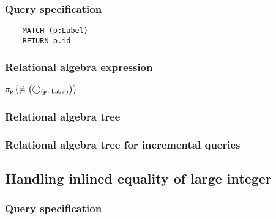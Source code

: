 	\subsubsection*{Query specification}

	\begin{lstlisting}
	MATCH (p:Label)
	RETURN p.id
	\end{lstlisting}


	\subsubsection*{Relational algebra expression}

	$\projection{\var{p}} \left(\alldifferent{} \left(\getvertices{p}{Label}\right)\right)$

	\subsubsection*{Relational algebra tree}


	\subsubsection*{Relational algebra tree for incremental queries}

	\subsection{Handling inlined equality of large integer}

	\subsubsection*{Query specification}

